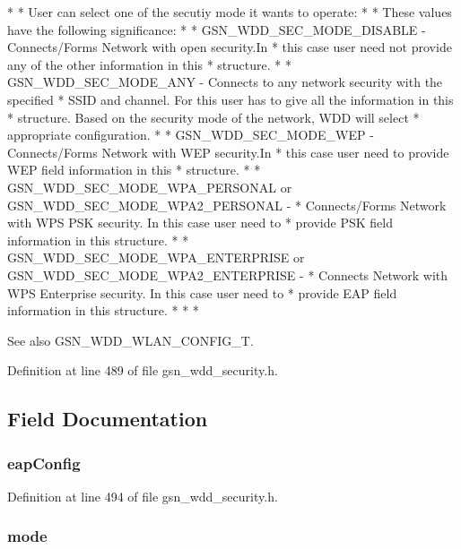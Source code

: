 \begin{DoxyVerb}
 *
 * User can select one of the secutiy mode it wants to operate:
 *
 *  These values have the following significance:
 *
 *  GSN_WDD_SEC_MODE_DISABLE - Connects/Forms Network with open security.In
 *  this case user need not provide any of the other information in this
 *  structure.
 *
 *  GSN_WDD_SEC_MODE_ANY - Connects to any network security with the specified
 *  SSID and channel. For this user has to give all the information in this
 *  structure. Based on the security mode of the network, WDD will select
 *  appropriate configuration.
 *
 *  GSN_WDD_SEC_MODE_WEP - Connects/Forms Network with WEP security.In
 *  this case user need to provide WEP field information in this
 *  structure.
 *
 *  GSN_WDD_SEC_MODE_WPA_PERSONAL or GSN_WDD_SEC_MODE_WPA2_PERSONAL -
 *  Connects/Forms Network with WPS PSK security. In this case user need to
 *  provide PSK field information in this structure.
 *
 *  GSN_WDD_SEC_MODE_WPA_ENTERPRISE or GSN_WDD_SEC_MODE_WPA2_ENTERPRISE -
 *  Connects Network with WPS Enterprise security. In this case user need to
 *  provide EAP field information in this structure.
 *
 *
 * \end{DoxyVerb}


\begin{DoxySeeAlso}{See also}
GSN\_\-WDD\_\-WLAN\_\-CONFIG\_\-T. 
\end{DoxySeeAlso}


Definition at line 489 of file gsn\_\-wdd\_\-security.h.



\subsection{Field Documentation}
\hypertarget{a00297_a99bcdfb3a660b4a529e3bdedc05bc9a1}{
\subsubsection[{eapConfig}]{ {\bf eapConfig}}}
\label{a00297_a99bcdfb3a660b4a529e3bdedc05bc9a1}


Definition at line 494 of file gsn\_\-wdd\_\-security.h.

\hypertarget{a00297_a07f5ab6b033b5775266d7c9c196897cf}{
\subsubsection[{mode}]{ {\bf mode}}}
\label{a00297_a07f5ab6b033b5775266d7c9c196897cf}


